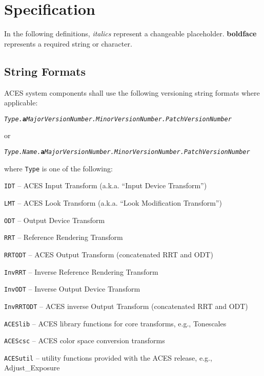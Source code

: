 \regularsectionformat
\chapter{Specification}
In the following definitions, \textit{italics} represent a changeable placeholder. \textbf{boldface} represents a required string or character.

\section{String Formats}
ACES system components shall use the following versioning string formats where applicable:

\texttt{\textit{Type.}\textbf{a}\textit{MajorVersionNumber.MinorVersionNumber.PatchVersionNumber}}

or

\texttt{\textit{Type.Name.}\textbf{a}\textit{MajorVersionNumber.MinorVersionNumber.PatchVersionNumber}}

where \texttt{Type} is one of the following:

\begin{listize}
    \item \texttt{IDT} -- ACES Input Transform (a.k.a. ``Input Device Transform'')
    \item \texttt{LMT} -- ACES Look Transform (a.k.a. ``Look Modification Transform'')
    \item \texttt{ODT} -- Output Device Transform
    \item \texttt{RRT} -- Reference Rendering Transform
    \item \texttt{RRTODT} -- ACES Output Transform (concatenated RRT and ODT)
    \item \texttt{InvRRT} -- Inverse Reference Rendering Transform
    \item \texttt{InvODT} -- Inverse Output Device Transform
    \item \texttt{InvRRTODT} -- ACES inverse Output Transform (concatenated RRT and ODT)
    \item \texttt{ACESlib} -- ACES library functions for core transforms, e.g., Tonescales
    \item \texttt{ACEScsc} -- ACES color space conversion transforms
    \item \texttt{ACESutil} -- utility functions provided with the ACES release, e.g., Adjust\_Exposure
\end{listize}

